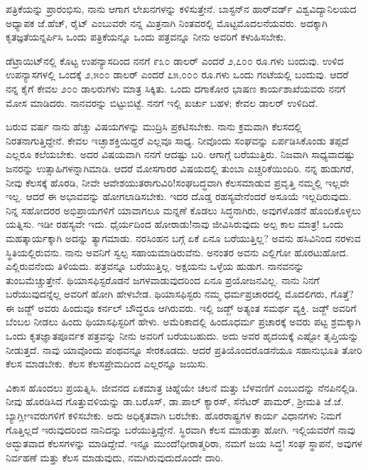 ಪತ್ರಿಕೆಯನ್ನು ಪ್ರಾರಂಭಿಸು, ನಾನು ಆಗಾಗ ಲೇಖನಗಳನ್ನು ಕಳಿಸುತ್ತೇನೆ. ಬಾಸ್ಟನ್‌ನ ಹಾರ್‌ವರ್ಡ್ ವಿಶ್ವವಿದ್ಯಾನಿಲಯದ ಅಧ್ಯಾಪಕ ಜೆ.ಹೆಚ್, ರೈಟ್ ಎಂಬುವರೇ ನನ್ನ ಮಿತ್ರನಾಗಿ ನಿಂತವರಲ್ಲಿ ಮೊಟ್ಟಮೊದಲನೆಯವರು. ಅದಕ್ಕಾಗಿ ಕೃತಜ್ಞತೆಯನ್ನರ್ಪಿಸಿ ಒಂದು ಪತ್ರಿಕೆಯನ್ನೂ ಒಂದು ಪತ್ರವನ್ನೂ ನೀನು ಅವರಿಗೆ ಕಳುಹಿಸಬೇಕು.

ಡೆಟ್ರಾಯಿಟ್‌ನಲ್ಲಿ ಕೊಟ್ಟ ಉಪನ್ಯಾಸದಿಂದ ನನಗೆ ೯೩೦ ಡಾಲರ್ ಎಂದರೆ ೨,೭೦೦ ರೂ.ಗಳು ಬಂದುವು. ಉಳಿದ ಉಪನ್ಯಾಸಗಳಲ್ಲಿ ಒಂದಕ್ಕೆ ೨,೫೦೦ ಡಾಲರ್ ಎಂದರೆ ೭೫,೦೦೦ ರೂ.ಗಳು ಒಂದು ಗಂಟೆಯಲ್ಲಿ ಬಂದುವು. ಆದರೆ ನನ್ನ ಕೈಗೆ ಕೇವಲ ೨೦೦ ಡಾಲರುಗಳು ಮಾತ್ರ ಸಿಕ್ಕಿತು. ಒಂದು ದಗಾಕೋರ ಭಾಷಣ ಕಾರ್ಯಶಾಖೆಯವರು ನನಗೆ ಮೋಸ ಮಾಡಿದರು. ನಾನವರನ್ನು ಬಿಟ್ಟುಬಿಟ್ಟೆ. ನನಗೆ ಇಲ್ಲಿ ಖರ್ಚು ಬಹಳ; ಕೇವಲ  ಡಾಲರ್‌ ಉಳಿದಿದೆ.

ಬರುವ ವರ್ಷ ನಾನು ಹೆಚ್ಚು ವಿಷಯಗಳನ್ನು ಮುದ್ರಿಸಿ ಪ್ರಕಟಿಸಬೇಕು. ನಾನು ಕ್ರಮವಾಗಿ ಕೆಲಸದಲ್ಲಿ ನಿರತನಾಗುತ್ತಿದ್ದೇನೆ. ಕೇವಲ ಇಚ್ಛಾಶಕ್ತಿಯಿದ್ದರೆ ಎಲ್ಲವೂ ಸಾಧ್ಯ. ನೀವೊಂದು ಸಂಘವನ್ನು ಏರ್ಪಡಿಸಿಕೊಂಡು ತಪ್ಪದೆ ಎಲ್ಲರೂ ಕಲೆಯಬೇಕು. ಅದರ ವಿಷಯವಾಗಿ ನನಗೆ ಆದಷ್ಟು ಬರಿ. ಆಗಾಗ್ಗೆ ಬರೆಯುತ್ತಿರು. ನಿಜವಾಗಿ ಸಾಧ್ಯವಾದಷ್ಟು ಜನರನ್ನು ಉತ್ಸಾಹಿಗಳನ್ನಾಗಿಮಾಡಿ. ಆದರೆ ಮೋಸಗಾರರ ವಿಷಯದಲ್ಲಿ ತುಂಬಾ ಎಚ್ಚರಿಕೆಯಿಂದಿರಿ. ನನ್ನ ಹುಡುಗರೆ, ನೀವು ಕೆಲಸಕ್ಕೆ ಹೊರಡಿ, ನೀವೇ ಆವೇಶಯುತರಾಗುವಿರಿ!ಸಂಘಬದ್ಧವಾಗಿ ಕೆಲಸಮಾಡುವ ಪ್ರವೃತ್ತಿ ನಮ್ಮಲ್ಲಿ ಇಲ್ಲವೇ ಇಲ್ಲ. ಆದರೆ ಈ ಅಭಾವವನ್ನು ಹೋಗಲಾಡಿಸಬೇಕು. ಇದರ ದೊಡ್ಡ ರಹಸ್ಯವೇನೆಂದರೆ ಅಸೂಯೆ ಇಲ್ಲದಿರುವುದು. ನಿನ್ನ ಸಹೋದರರ ಅಭಿಪ್ರಾಯಗಳಿಗೆ ಯಾವಾಗಲೂ ಮನ್ನಣೆ ಕೊಡಲು ಸಿದ್ಧನಾಗಿರು, ಅವುಗಳೊಡನೆ ಹೊಂದಿಕೊಳ್ಳಲು ಯತ್ನಿಸು. ಇಡೀ ರಹಸ್ಯವೇ ಇದು. ಧೈರ್ಯದಿಂದ ಹೋರಾಡು!ನಾವು ಜೀವಿಸಿರುವುದು ಅಲ್ಪ ಕಾಲ ಮಾತ್ರ! ಒಂದು ಮಹತ್ಕಾರ್ಯಕ್ಕಾಗಿ ಅದನ್ನು ತ್ಯಾಗಮಾಡು. ನರಸಿಂಹನ ಬಗ್ಗೆ ಏಕೆ ಏನೂ ಬರೆಯುತ್ತಿಲ್ಲ? ಅವನು ಹಸಿವಿನಿಂದ ನರಳುವ ಸ್ಥಿತಿಯಲ್ಲಿರುವನು. ನಾನು ಅವನಿಗೆ ಸ್ವಲ್ಪ ಸಹಾಯಮಾಡಿರುವೆನು. ಅನಂತರ ಅವನು ಎಲ್ಲಿಗೋ ಹೊರಟುಹೋದ. ಎಲ್ಲಿರುವನೆಂದು ತಿಳಿಯದು. ಪತ್ರವನ್ನೂ ಬರೆಯುತ್ತಿಲ್ಲ. ಅಕ್ಷಯನು ಒಳ್ಳೆಯ ಹುಡುಗ. ನಾನವನನ್ನು ತುಂಬಮೆಚ್ಚುತ್ತೇನೆ. ಥಿಯಾಸಫಿಸ್ಟರೊಡನೆ ಜಗಳವಾಡುವುದರಿಂದ ಏನೂ ಪ್ರಯೋಜನವಿಲ್ಲ. ನಾನು ನಿನಗೆ ಬರೆಯುವುದನ್ನೆಲ್ಲ ಅವರಿಗೆ ಹೋಗಿ ಹೇಳಬೇಡ. ಥಿಯಾಸಫಿಸ್ಟರು ನಮ್ಮ ಧರ್ಮಪ್ರಚಾರದಲ್ಲಿ ಮೊದಲಿಗರು, ಗೊತ್ತೆ? ಈ ಜಡ್ಜ್ ಅವರು ಹಿಂದುವೂ ಕರ್ನಲ್ ಬೌದ್ಧರೂ ಆಗಿರುವರು. ಇಲ್ಲಿ ಜಡ್ಜ್ ಅತ್ಯಂತ ಸಮರ್ಥ ವ್ಯಕ್ತಿ. ಜಡ್ಜ್ ಅವರಿಗೆ ಬೆಂಬಲ ನೀಡಲು ಹಿಂದು ಥಿಯಾಸಫಿಸ್ಟರಿಗೆ ಹೇಳು. ಅಮೆರಿಕಾದಲ್ಲಿ ಹಿಂದೂಧರ್ಮ ಪ್ರಚಾರಕ್ಕೆ ಅವರು ಪಟ್ಟ ಶ್ರಮಕ್ಕಾಗಿ ಒಂದು ಕೃತಜ್ಞಾತಪೂರ್ವಕ ಪತ್ರವನ್ನು ನೀನು ಅವರಿಗೆ ಬರೆಯಬಹುದು. ಅದು ಅವರ ಹೃದಯಕ್ಕೆ ಎಷ್ಟೋ ತೃಪ್ತಿಯನ್ನು ನೀಡುತ್ತದೆ. ನಾವು ಯಾವೊಂದು ಪಂಥವನ್ನೂ ಸೇರಕೂಡದು. ಆದರೆ ಪ್ರತಿಯೊಂದರೊಡನೆಯೂ ಸಹಾನುಭೂತಿ ತೋರಿ ಕೆಲಸ ಮಾಡಬೇಕು. ಕೆಲಸ ಕೆಲಸ\enginline{-}ಪ್ರೇಮದಿಂದ ಎಲ್ಲರನ್ನೂ ಜಯಿಸು.

ವಿಕಾಸ ಹೊಂದಲು ಪ್ರಯತ್ನಿಸಿ. ಜೀವನದ ಏಕಮಾತ್ರ ಚಿಹ್ನೆಯೇ ಚಲನೆ ಮತ್ತು ಬೆಳವಣಿಗೆ ಎಂಬುದನ್ನು ನೆನಪಿನಲ್ಲಿಡಿ. ನೀವು ಹೊರಡಿಸಿದ ಗೊತ್ತುವಳಿಯನ್ನು ಡಾ.ಬರೊಸ್, ಡಾ.ಪಾಲ್ ಕ್ಯಾರಸ್, ಸೆನೆಟರ್ ಪಾಮರ್, ಶ‍್ರೀಮತಿ ಜೆ.ಜೆ. ಬ್ಯಾಗ್ಲೀ\enginline{-}ಇವರುಗಳಿಗೆ ಕಳಿಸಬೇಕು. ಅದು ಅಧಿಕೃತವಾಗಿ ಬರಬೇಕು. ಹೊರರಾಷ್ಟ್ರಗಳ ಕಾರ್ಯ ವಿಧಾನಗಳು ನಿಮಗೆ ಗೊತ್ತಿಲ್ಲದೆ ಇರುವುದರಿಂದ ನಾನಿದನ್ನು ಬರೆಯುತ್ತಿದ್ದೇನೆ. ಸ್ಥಿರವಾಗಿ ಕೆಲಸ ಮಾಡುತ್ತಾ ಹೋಗಿ. ಇಲ್ಲಿಯವರೆಗೆ ನಾವು ಅದ್ಭುತವಾದ ಕೆಲಸಗಳನ್ನು ಮಾಡಿದ್ದೇವೆ. ಇನ್ನೂ ಮುಂದೆ!ಧೀರಾತ್ಮರಿರಾ, ನಮಗೆ ಜಯ ಸಿದ್ಧ! ಸಂಘ ಸ್ಥಾಪನೆ, ಅವುಗಳ ನಿರ್ವಹಣೆ ಮತ್ತು ಕೆಲಸ ಮಾಡುವುದು, ನಮಗಿರುವುದುದೊಂದೇ ದಾರಿ.

